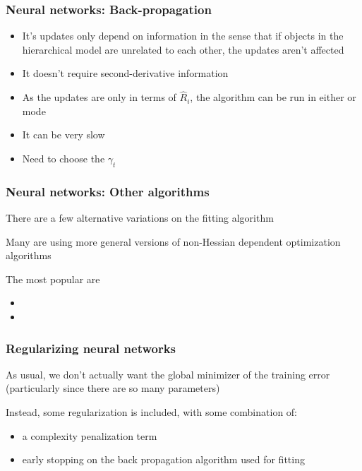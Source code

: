 \documentclass[12pt]{beamer}
\begin{document}
\begin{frame}[fragile]
\frametitle{Neural networks: Back-propagation}
\begin{itemize}
\item It's updates only depend on  information in the sense that if objects in the hierarchical model
are unrelated to each other, the updates aren't affected

\item It doesn't require second-derivative information
\item As the updates are only in terms of $\hat{R}_i$, the algorithm can be run in either  or 
mode
\end{itemize}
\begin{itemize}
\item It can be very slow
\item Need to choose the  $\gamma_t$

\end{itemize}

\end{frame}

\begin{frame}[fragile]
\frametitle{Neural networks: Other algorithms}
There are a few alternative variations on the fitting algorithm

\vsp
Many are using more general versions of non-Hessian dependent optimization algorithms


\vsp
The most popular are
\begin{itemize}
\item {} %

\item {}

\end{itemize}
\end{frame}

\begin{frame}[fragile]
\frametitle{Regularizing neural networks}
As usual, we don't actually want the global minimizer of the training error (particularly since there are so many parameters)

\vsp
Instead, some regularization is included, with some combination of:
\begin{itemize}
\item a complexity penalization term
\item early stopping on the back propagation algorithm used for fitting

\end{itemize}
\end{frame}
\end{document}
